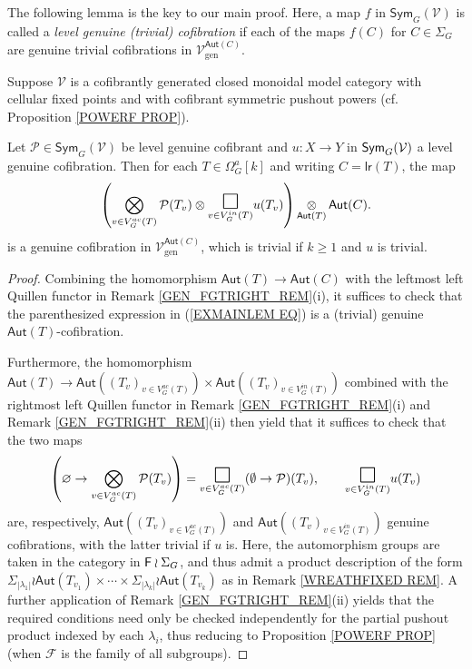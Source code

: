 \documentclass[a4paper,10pt]{article}%
\begin{document}
The following lemma is the key to our main proof. 
Here, a map $f$ in 
$\mathsf{Sym}_G(\mathcal{V})$ is called
a \textit{level genuine (trivial) cofibration} if each of the maps
$f(C)$ for $C \in \Sigma_G$ are genuine trivial cofibrations in
$\mathcal{V}^{\mathsf{Aut}(C)}_{\text{gen}}$.

\begin{lemma}\label{EXMAINLEM LEM}
	Suppose $\mathcal{V}$ is a cofibrantly generated closed monoidal model category
	with cellular fixed points and
	with cofibrant symmetric pushout powers 
	(cf. Proposition \ref{POWERF PROP}).
	
	Let $\mathcal{P} \in \mathsf{Sym}_G(\mathcal{V})$
	be level genuine cofibrant
	and  
	$u: X \to Y$ in $\mathsf{Sym}_G(\mathcal V)$ a level genuine cofibration. 
	Then for each $T \in \Omega^a_G[k]$ and writing
	$C = \mathsf{lr}(T)$, the map	
\begin{equation}\label{EXMAINLEM EQ}
	\left(
		\bigotimes\limits_{v \in V_{G}^{ac}(T)}\P(T_v) \otimes
		\underset{v \in V_{G}^{in}(T)}
	{\mathlarger{\mathlarger{\mathlarger{\square}}}}
		u(T_v)
	\right) 
	\mathop{\otimes}\limits_{\mathsf{Aut}(T)} \mathsf{Aut}(C).
\end{equation}
	is a genuine cofibration in 
	$\mathcal{V}^{\mathsf{Aut}(C)}_{\text{gen}}$,
	which is trivial if $k \geq 1$ and $u$ is trivial.	
\end{lemma}


\begin{proof}
	Combining the homomorphism $\mathsf{Aut}(T) \to \mathsf{Aut}(C)$ with the leftmost left Quillen functor in 
	Remark \ref{GEN_FGTRIGHT_REM}(i),
	it suffices to check that the parenthesized 
	expression in (\ref{EXMAINLEM EQ})
	is a (trivial) genuine 
	$\mathsf{Aut}(T)$-cofibration.

	Furthermore, the homomorphism
	$\mathsf{Aut}(T) \to 
	\mathsf{Aut}\left( (T_v)_{v \in V_G^{ac}(T)}\right) \times 
	\mathsf{Aut}\left( (T_v)_{v \in V_G^{in}(T)}\right)$
	combined with the rightmost left Quillen functor in Remark \ref{GEN_FGTRIGHT_REM}(i) and Remark \ref{GEN_FGTRIGHT_REM}(ii)
	then yield that it suffices to check that the two maps
\[
\left( \varnothing \to \bigotimes\limits_{v \in V_{G}^{ac}(T)}\P(T_v) \right)
=
\underset{v \in V_{G}^{ac}(T)}{\mathlarger{\mathlarger{\mathlarger{\square}}}}
(\emptyset \to \P)(T_v),
	\qquad
\underset{v \in V_{G}^{in}(T)}{\mathlarger{\mathlarger{\mathlarger{\square}}}}
u(T_v)
\]
are, respectively, 
$\mathsf{Aut}\left( (T_v)_{v \in V_G^{ac}(T)}\right)$ and 
$\mathsf{Aut}\left( (T_v)_{v \in V_G^{in}(T)}\right)$
genuine cofibrations, with the latter trivial if $u$ is. Here, the automorphism groups are taken in the category in $\mathsf{F} \wr \Sigma_G$,
and thus admit a product description of the form
$
	\Sigma_{|\lambda_1|} \wr 
	\mathsf{Aut}(T_{v_1})
		\times \cdots \times	
	\Sigma_{|\lambda_k|} \wr 
	\mathsf{Aut}(T_{v_k})
$
as in Remark \ref{WREATHFIXED REM}.
A further application of Remark \ref{GEN_FGTRIGHT_REM}(ii)
yields that the required conditions need only be checked independently for the
partial pushout product indexed by each $\lambda_i$,
thus reducing to 
Proposition \ref{POWERF PROP}
(when $\mathcal{F}$ is the family of all subgroups).
\end{proof}
\end{document}
